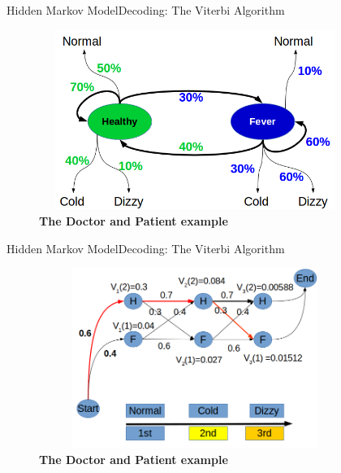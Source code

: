 \documentclass[10pt]{beamer}
\begin{document}
\begin{frame}{Hidden Markov Model}{Decoding: The Viterbi Algorithm}
  \begin{figure}[h]
    \centering
    \includegraphics[width=4in,height=2.3in]{figures/doctor_example_01.png}
    \caption {\textbf{The Doctor and Patient example}}
  \end{figure}
\end{frame}

\begin{frame}{Hidden Markov Model}{Decoding: The Viterbi Algorithm}
  \begin{figure}[h]
    \centering
    \includegraphics[width=4in,height=2.3in]{figures/doctor_example_02.png}
    \caption {\textbf{The Doctor and Patient example}}
  \end{figure}
\end{frame}
\end{document}
